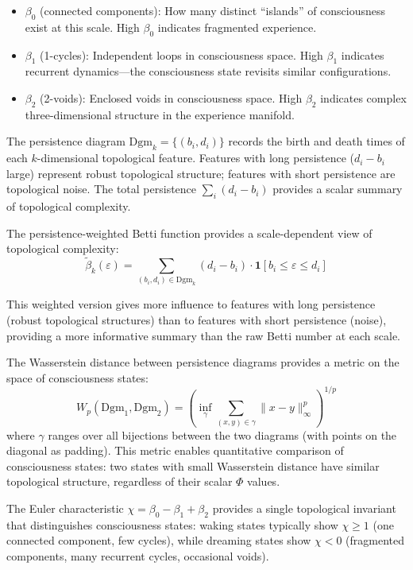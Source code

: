 \documentclass[12pt]{book}
\begin{document}
\begin{itemize}
  \item $\beta_0$ (connected components): How many distinct ``islands'' of consciousness exist at this scale. High $\beta_0$ indicates fragmented experience.
  \item $\beta_1$ (1-cycles): Independent loops in consciousness space. High $\beta_1$ indicates recurrent dynamics---the consciousness state revisits similar configurations.
  \item $\beta_2$ (2-voids): Enclosed voids in consciousness space. High $\beta_2$ indicates complex three-dimensional structure in the experience manifold.
\end{itemize}

The persistence diagram $\text{Dgm}_k = \{(b_i, d_i)\}$ records the birth and death times of each $k$-dimensional topological feature. Features with long persistence ($d_i - b_i$ large) represent robust topological structure; features with short persistence are topological noise. The total persistence $\sum_i (d_i - b_i)$ provides a scalar summary of topological complexity.

The persistence-weighted Betti function provides a scale-dependent view of topological complexity:
\begin{equation}
\tilde{\beta}_k(\varepsilon) = \sum_{(b_i, d_i) \in \text{Dgm}_k} (d_i - b_i) \cdot \mathbf{1}[b_i \leq \varepsilon \leq d_i]
\end{equation}

This weighted version gives more influence to features with long persistence (robust topological structures) than to features with short persistence (noise), providing a more informative summary than the raw Betti number at each scale.

The Wasserstein distance between persistence diagrams provides a metric on the space of consciousness states:
\begin{equation}
W_p(\text{Dgm}_1, \text{Dgm}_2) = \left(\inf_{\gamma} \sum_{(x,y) \in \gamma} \|x - y\|^p_\infty\right)^{1/p}
\end{equation}
where $\gamma$ ranges over all bijections between the two diagrams (with points on the diagonal as padding). This metric enables quantitative comparison of consciousness states: two states with small Wasserstein distance have similar topological structure, regardless of their scalar $\Phi$ values.

The Euler characteristic $\chi = \beta_0 - \beta_1 + \beta_2$ provides a single topological invariant that distinguishes consciousness states: waking states typically show $\chi \geq 1$ (one connected component, few cycles), while dreaming states show $\chi < 0$ (fragmented components, many recurrent cycles, occasional voids).
\end{document}
